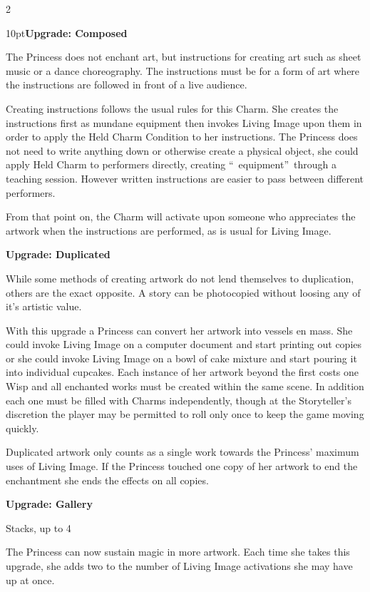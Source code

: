 \begin{multicols}{2}
\begin{myindentpar}{10pt}\textbf{Upgrade: Composed}

The Princess does not enchant art, but instructions for creating art such as sheet music or a dance choreography. The instructions must be for a form of art where the instructions are followed in front of a live audience. 

Creating instructions follows the usual rules for this Charm. She creates the instructions first as mundane equipment then invokes Living Image upon them in order to apply the Held Charm Condition to her instructions. The Princess does not need to write anything down or otherwise create a physical object, she could apply Held Charm to performers directly, creating \textquotedblleft\, equipment\textquotedblright\, through a teaching session. However written instructions are easier to pass between different performers. 

From that point on, the Charm will activate upon someone who appreciates the artwork when the instructions are performed, as is usual for Living Image.    

\textbf{Upgrade: Duplicated}

While some methods of creating artwork do not lend themselves to duplication, others are the exact opposite. A story can be photocopied without loosing any of it's artistic value. 

With this upgrade a Princess can convert her artwork into vessels en mass. She could invoke Living Image on a computer document and start printing out copies or she could invoke Living Image on a bowl of cake mixture and start pouring it into individual cupcakes. Each instance of her artwork beyond the first costs one Wisp and all enchanted works must be created within the same scene. In addition each one must be filled with Charms independently, though at the Storyteller's discretion the player may be permitted to roll only once to keep the game moving quickly.

Duplicated artwork only counts as a single work towards the Princess' maximum uses of Living Image. If the Princess touched one copy of her artwork to end the enchantment she ends the effects on all copies. 

\textbf{Upgrade: Gallery}

Stacks, up to 4

The Princess can now sustain magic in more artwork. Each time she takes this upgrade, she adds two to the number of Living Image activations she may have up at once.


\end{myindentpar}
\end{multicols}
